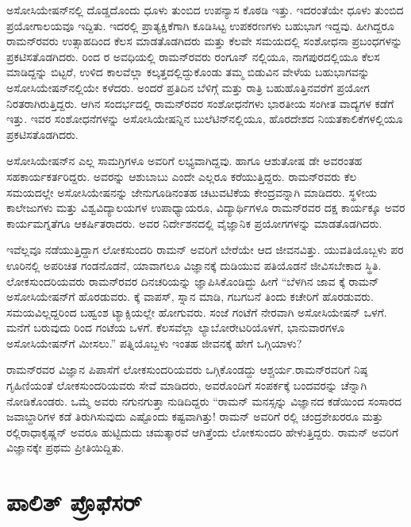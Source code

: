 ಅಸೋಸಿಯೇಷನ್‍ನಲ್ಲಿ ದೊಡ್ಡದೊಂದು ಧೂಳು ತುಂಬಿದ ಉಪನ್ಯಾಸ ಕೊಠಡಿ ಇತ್ತು. ಇದರಂತೆಯೇ ಧೂಳು ತುಂಬಿದ ಪ್ರಯೋಗಾಲಯವೂ ಇದ್ದಿತು. ಇದರಲ್ಲಿ ಪ್ರಾತ್ಯಕ್ಷಿಕೆಗಾಗಿ ಕೂಡಿಸಿಟ್ಟ ಉಪಕರಣಗಳು ಬಹುಭಾಗ ಇದ್ದವು. ಹೀಗಿದ್ದರೂ ರಾಮನ್‍ರವರು ಉತ್ಸಾಹದಿಂದ ಕೆಲಸ ಮಾಡತೊಡಗಿದರು ಮತ್ತು ಕೆಲವೇ ಸಮಯದಲ್ಲಿ ಸಂಶೋಧನಾ ಪ್ರಬಂಧಗಳನ್ನು ಪ್ರಕಟಿಸತೊಡಗಿದರು. ರಿಂದ ರ ಅವಧಿಯಲ್ಲಿ ರಾಮನ್‍ರವರು ರಂಗೂನ್ ನಲ್ಲಿಯೂ, ನಾಗಪುರದಲ್ಲಿಯೂ ಕೆಲಸ ಮಾಡಿದ್ದನ್ನು ಬಿಟ್ಟರೆ, ಉಳಿದ ಕಾಲವೆಲ್ಲಾ ಕಲ್ಕತ್ತದಲ್ಲಿದ್ದುಕೊಂಡು ತಮ್ಮ ಬಿಡುವಿನ ವೇಳೆಯ ಬಹುಭಾಗವನ್ನು ಅಸೋಸಿಯೇಷನ್‍ನಲ್ಲಿಯೇ ಕಳೆದರು. ಅಂದರೆ ಪ್ರತಿದಿನ ಬೆಳಿಗ್ಗೆ ಮತ್ತು ರಾತ್ರಿ ಬಹುಹೊತ್ತಿನವರೆಗೆ ಪ್ರಯೋಗ ನಿರತರಾಗಿರುತ್ತಿದ್ದರು. ಆಗಿನ ಸಂದರ್ಭದಲ್ಲಿ ರಾಮನ್‍ರವರ ಸಂಶೋಧನೆಗಳು ಭಾರತೀಯ ಸಂಗೀತ ವಾದ್ಯಗಳ ಕಡೆಗೆ ಇತ್ತು. ಇವರ ಸಂಶೋಧನೆಗಳನ್ನು ಅಸೋಸಿಯೇಷನ್ನಿನ ಬುಲೆಟಿನ್‍ನಲ್ಲಿಯೂ, ಹೊರದೇಶದ ನಿಯತಕಾಲಿಕೆಗಳಲ್ಲಿಯೂ ಪ್ರಕಟಿಸತೊಡಗಿದರು.

ಅಸೋಸಿಯೇಷನ್‍ನ ಎಲ್ಲ ಸಾಮಗ್ರಿಗಳೂ ಅವರಿಗೆ ಲಭ್ಯವಾಗಿದ್ದವು. ಹಾಗೂ ಆಶುತೋಷ ಡೇ ಅವರಂತಹ ಸಹಕಾರ್ಯಕರ್ತರಿದ್ದರು. ಅವರನ್ನು ಆಶುಬಾಬು ಎಂದೇ ಎಲ್ಲರೂ ಕರೆಯುತ್ತಿದ್ದರು. ರಾಮನ್‍ರವರು ಕೆಲ ಸಮಯದಲ್ಲೇ ಅಸೋಸಿಯೇಷನನ್ನು ಜೇನುಗೂಡಿನಂತಹ ಚಟುವಟಿಕೆಯ ಕೇಂದ್ರವನ್ನಾಗಿ ಮಾಡಿದರು. ಸ್ಥಳೀಯ ಕಾಲೇಜುಗಳು ಮತ್ತು ವಿಶ್ವವಿದ್ಯಾಲಯಗಳ ಉಪಾಧ್ಯಾಯರೂ, ವಿದ್ಯಾರ್ಥಿಗಳೂ ರಾಮನ್‍ರವರ ದಕ್ಷ ಕಾರ್ಯಕ್ಕೂ ಅವರ ಕಾರ್ಯಮಗ್ನತೆಗೂ ಆಕರ್ಷಿತರಾದರು. ಅವರ ನಿರ್ದೇಶನದಲ್ಲಿ ವೈಜ್ಞಾನಿಕ ಪ್ರಯೋಗಗಳನ್ನು ಮಾಡತೊಡಗಿದರು.

ಇವೆಲ್ಲವೂ ನಡೆಯುತ್ತಿದ್ದಾಗ ಲೋಕಸುಂದರಿ ರಾಮನ್ ಅವರಿಗೆ ಬೇರೆಯೇ ಆದ ಜೀವನವಿತ್ತು. ಯುವತಿಯೊಬ್ಬಳು ಪರ ಊರಿನಲ್ಲಿ ಅಪರಿಚಿತ ಗಂಡನೊಡನೆ, ಯಾವಾಗಲೂ ವಿಜ್ಞಾನಕ್ಕೆ ದುಡಿಯುವ ಪತಿಯೊಡನೆ ಜೀವಿಸಬೇಕಾದ ಸ್ಥಿತಿ. ಲೋಕಸುಂದರಿಯವರು ರಾಮನ್‍ರವರ ದಿನಚರಿಯನ್ನು ಜ್ಞಾಪಿಸಿಕೊಂಡಿದ್ದು ಹೀಗೆ\enginline{-} “ಬೆಳಗಿನ ಜಾವ  ಕ್ಕೆ ರಾಮನ್ ಅಸೋಸಿಯೇಷನ್‍ಗೆ ಹೊರಡುವರು. ಕ್ಕೆ ವಾಪಸ್, ಸ್ನಾನ ಮಾಡಿ, ಗಬಗಬನೆ ತಿಂದು ಕಚೇರಿಗೆ ಹೊರಡುವರು. ಸಮಯವಿಲ್ಲದ್ದರಿಂದ ಬಹ್ವಂಶ ಟ್ಯಾಕ್ಸಿಯಲ್ಲೇ ಹೋಗುವರು. ಸಂಜೆ  ಗಂಟೆಗೆ ನೇರವಾಗಿ ಅಸೋಸಿಯೇಷನ್ ಒಳಗೆ. ಮನೆಗೆ ಬರುವುದು  ರಿಂದ  ಗಂಟೆಯ ಒಳಗೆ. ಕೆಲಸವೆಲ್ಲಾ ಲ್ಯಾಬೋರೇಟರಿಯೊಳಗೆ, ಭಾನುವಾರಗಳೂ ಅಸೋಸಿಯೇಷನ್‍ಗೆ ಮೀಸಲು.” ಪತ್ನಿಯೊಬ್ಬಳು ಇಂತಹ ಜೀವನಕ್ಕೆ ಹೇಗೆ ಒಗ್ಗಿಯಾಳು?

ರಾಮನ್‍ರವರ ವಿಜ್ಞಾನ ಪಿಪಾಸೆಗೆ ಲೋಕಸುಂದರಿಯವರು ಒಗ್ಗಿಕೊಂಡದ್ದು ಆಶ್ಚರ್ಯ.\break ರಾಮನ್‍ರವರಿಗೆ ನಿಷ್ಠ ಗೃಹಿಣಿಯಂತೆ ಲೋಕಸುಂದರಿಯವರು ಸೇವೆ ಮಾಡಿದರು, ಅವರೊಂದಿಗೆ ಸಂಪರ್ಕಕ್ಕೆ ಬಂದವರನ್ನು ಚೆನ್ನಾಗಿ ನೋಡಿಕೊಂಡರು. ಒಮ್ಮೆ ಅವರು ನಗುನಗುತ್ತಾ ನುಡಿದಿದ್ದರು  “ರಾಮನ್ ಮನಸ್ಸನ್ನು ವಿಜ್ಞಾನದ ಕಡೆಯಿಂದ ಸಂಸಾರದ ಜವಾಬ್ದಾರಿಗಳ ಕಡೆ ತಿರುಗಿಸುವುದು ಎಷ್ಟೊಂದು ಕಷ್ಟವಾಗಿತ್ತು! ರಾಮನ್ ಅವರಿಗೆ ರಲ್ಲಿ ಚಂದ್ರಶೇಖರರೂ ಮತ್ತು ರಲ್ಲಿ\break ರಾಧಾಕೃಷ್ಣನ್ ಅವರೂ ಹುಟ್ಟಿದುದು ಚಮತ್ಕಾರವೆ ಆಗಿತ್ತೆಂದು ಲೋಕಸುಂದರಿ ಹೇಳುತ್ತಿದ್ದರು. ರಾಮನ್ ಅವರಿಗೆ ವಿಜ್ಞಾನಕ್ಕೇ ಪ್ರಥಮ ಪ್ರೀತಿಯಿದ್ದಿತು.


\section{ಪಾಲಿತ್ ಪ್ರೊಫೆಸರ್}

